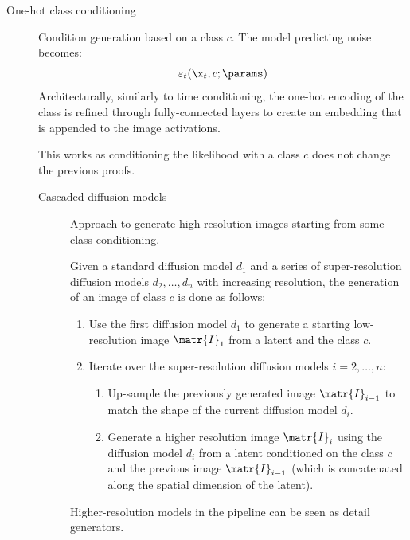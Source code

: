 \begin{description}
    \item[One-hot class conditioning] 
        Condition generation based on a class $c$. The model predicting noise becomes:
        \[ \varepsilon_t(\x_t, c; \params) \]
        Architecturally, similarly to time conditioning, the one-hot encoding of the class is refined through fully-connected layers to create an embedding that is appended to the image activations.

        \begin{remark}
            This works as conditioning the likelihood with a class $c$ does not change the previous proofs.
        \end{remark}

        \begin{description}
            \item[Cascaded diffusion models] 
                Approach to generate high resolution images starting from some class conditioning.

                Given a standard diffusion model $d_1$ and a series of super-resolution diffusion models $d_2, \dots, d_n$ with increasing resolution, the generation of an image of class $c$ is done as follows:
                \begin{enumerate}
                    \item Use the first diffusion model $d_1$ to generate a starting low-resolution image $\matr{I}_1$ from a latent and the class $c$.
                    \item Iterate over the super-resolution diffusion models $i=2, \dots, n$:
                    \begin{enumerate}
                        \item Up-sample the previously generated image $\matr{I}_{i-1}$ to match the shape of the current diffusion model $d_i$.
                        \item Generate a higher resolution image $\matr{I}_i$ using the diffusion model $d_i$ from a latent conditioned on the class $c$ and the previous image $\matr{I}_{i-1}$ (which is concatenated along the spatial dimension of the latent).
                    \end{enumerate}
                \end{enumerate}

            \begin{remark}
                Higher-resolution models in the pipeline can be seen as detail generators.
            \end{remark}


\end{description}
\end{description}
